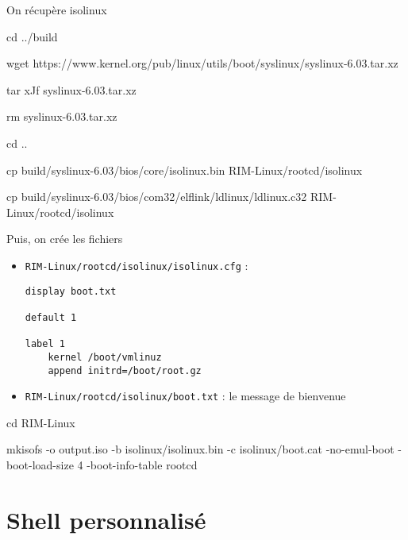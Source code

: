 \documentclass[]{article}
\newenvironment{Shaded}{}{}
\newcommand{\FunctionTok}[1]{\textcolor[rgb]{0.02,0.16,0.49}{{#1}}}
\newcommand{\BuiltInTok}[1]{{#1}}
\newcommand{\ExtensionTok}[1]{{#1}}
\newcommand{\NormalTok}[1]{{#1}}
\begin{document}
On récupère isolinux

\begin{Shaded}
\begin{Highlighting}[]

\BuiltInTok{cd} \NormalTok{../build}

\FunctionTok{wget} \NormalTok{https://www.kernel.org/pub/linux/utils/boot/syslinux/syslinux-6.03.tar.xz}

\FunctionTok{tar} \NormalTok{xJf syslinux-6.03.tar.xz}

\FunctionTok{rm} \NormalTok{syslinux-6.03.tar.xz}

\BuiltInTok{cd} \NormalTok{..}

\FunctionTok{cp} \NormalTok{build/syslinux-6.03/bios/core/isolinux.bin RIM-Linux/rootcd/isolinux}

\FunctionTok{cp} \NormalTok{build/syslinux-6.03/bios/com32/elflink/ldlinux/ldlinux.c32 RIM-Linux/rootcd/isolinux}
\end{Highlighting}
\end{Shaded}

Puis, on crée les fichiers

\begin{itemize}
\item
  \texttt{RIM-Linux/rootcd/isolinux/isolinux.cfg} :

\begin{verbatim}
display boot.txt

default 1

label 1
    kernel /boot/vmlinuz
    append initrd=/boot/root.gz
\end{verbatim}
\item
  \texttt{RIM-Linux/rootcd/isolinux/boot.txt} : le message de bienvenue
\end{itemize}

\begin{Shaded}
\begin{Highlighting}[]
\BuiltInTok{cd} \NormalTok{RIM-Linux}

\ExtensionTok{mkisofs} \NormalTok{-o output.iso -b isolinux/isolinux.bin -c isolinux/boot.cat -no-emul-boot -boot-load-size 4 -boot-info-table rootcd}
\end{Highlighting}
\end{Shaded}

\section{Shell personnalisé}\label{shell-personnalisuxe9}
\end{document}
